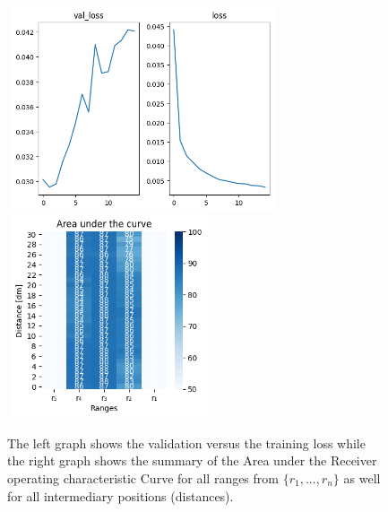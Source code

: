 \begin{figure}[h]%
\centering
\includegraphics[width=8cm,height=6cm]{3_models/models_3/graph_3.png} 
\hspace{0.2 cm}
\includegraphics[width=6cm,height=6cm]{4_plots/plots_3/AUC_3.png} 
\caption[]{The left graph shows the validation versus the training loss while the right graph shows the summary of the Area under the Receiver operating characteristic Curve for all ranges from $\{r_{1}, ... ,r_{n}\}$ as well for all intermediary positions (distances).}
\label{theta_alt}
\end{figure}


\newpage

